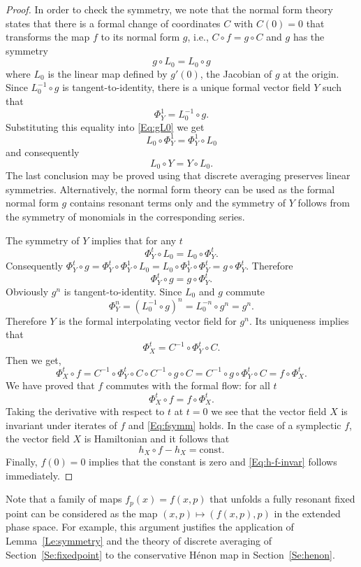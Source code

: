 \documentclass[a4paper,12pt]{article}
\begin{document}
\begin{proof}
In order to check the symmetry, we note that 
the normal form theory states that there is a formal change of coordinates $C$ with $C(0)=0$ 
that transforms the map $f$ to its normal form $g$, i.e., $C \circ f = g \circ C$ and 
$g$ has the symmetry
\begin{equation}\label{Eq:gL0}
g \circ L_0 = L_0 \circ g
\end{equation}
where $L_0$ is the	linear map defined by $g'(0)$, the Jacobian of $g$ at the origin.
Since $L_0^{-1}\circ g$ is tangent-to-identity,
there is a unique formal vector field $Y$ such that
\[
\Phi_Y^1 = L_0^{-1} \circ g.
\]
Substituting this equality into \eqref{Eq:gL0} we  get 
\[
L_0\circ \Phi^1_Y=\Phi^1_Y\circ L_0
\]
and consequently
\[
L_0\circ Y=Y\circ L_0.
\]
The last conclusion may be proved using that discrete averaging 
preserves  linear symmetries. Alternatively, the normal form theory
 can be used as the formal normal form $g$ contains  
 resonant terms only and the symmetry of $Y$ follows from the symmetry of monomials in the corresponding series. 
 
The symmetry of $Y$ implies that for any $t$
\[
\Phi_Y^t \circ  L_0=L_0 \circ  \Phi_Y^t.
\]
Consequently
\(
\Phi_Y^t\circ g = \Phi_Y^t\circ \Phi^1_Y\circ L_0=L_0\circ \Phi_Y^1\circ \Phi^t_Y=g\circ \Phi_Y^t.
\)
Therefore
\[
\Phi_Y^t\circ g =g\circ \Phi_Y^t.
\]
Obviously $g^n$ is tangent-to-identity.
Since $L_0$ and $g$ commute
\[
\Phi_Y^n=(L_0^{-1}\circ g)^n=L_0^{-n}\circ g^n=g^n.
\]
Therefore $Y$ is the formal interpolating vector field for $g^n$.
Its uniqueness implies that
\[
\Phi_X^t=C^{-1}\circ \Phi_Y^t\circ C.
\]
Then we get,
\[
\Phi_X^t\circ f=C^{-1}\circ \Phi_Y^t\circ C\circ C^{-1}\circ g\circ C=
C^{-1}\circ g \circ  \Phi_Y^t\circ C=f\circ \Phi_X^t.
\]
We have proved that $f$ commutes with the formal flow: for all $t$
\[
\Phi_X^t \circ f=f\circ \Phi_X^t.
\]
Taking the derivative with respect to $t$ at $t=0$ we see that  the vector field $X$ is invariant under iterates of $f$ and \eqref{Eq:fsymm} holds. 
In the case of a symplectic $f$, the vector field $X$ is Hamiltonian and  it follows that 
\[
  h_X \circ f - h_X=\mathrm{const}.
\]
Finally, $f(0)=0$ implies that the constant is zero and \eqref{Eq:h-f-invar} follows immediately.
\end{proof}

Note that  a family of maps $f_p(x)=f(x,p)$ that unfolds a fully resonant fixed point
can be considered as the map $(x,p)\mapsto (f(x,p),p)$
 in the extended phase space. For example,
this argument justifies the application of Lemma~\ref{Le:symmetry}
and the theory of discrete averaging of Section~\ref{Se:fixedpoint} to the conservative  Hénon map in Section~\ref{Se:henon}.
\end{document}
